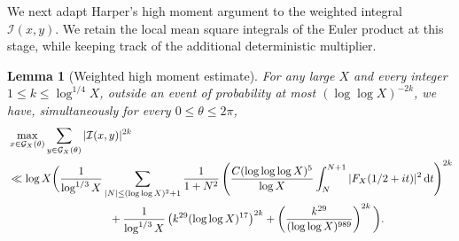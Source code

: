 \documentclass[a4paper,12pt,reqno]{amsart}
\numberwithin{equation}{section}
\newtheorem{lemma}[theorem]{Lemma}
\theoremstyle{remark}
\begin{document}
We next adapt Harper's high moment argument
\cite[Proposition~3 and Section~3.4]{Harper2023Large} to the weighted
integral ${\mathcal I}(x,y)$.  We retain the local mean square integrals
of the Euler product at this stage, while keeping track of the additional
deterministic multiplier.

\begin{lemma}[Weighted high moment estimate]
\label{lem:weighted-high-moment}
For any large $X$ and every integer $1\leq k\leq\log^{1/4}X$, outside an event of
probability at most $(\log\log X)^{-2k}$, we have, simultaneously for
every $0\leq\theta\leq2\pi$,
\begin{align}
 &\max_{x\in{\mathcal G}_X(\theta)}
 \sum_{y\in{\mathcal G}_X(\theta)}|{\mathcal I}(x,y)|^{2k}\notag\\
 &\ll \log X\bigg(
 \frac1{\log^{1/3}X}
 \sum_{|N|\leq(\log\log X)^2+1}\frac1{1+N^2}
 \left(
 \frac{C(\log\log\log X)^5}{\log X}
 \int_N^{N+1}|F_X(1/2+it)|^2\,\mathrm{d}t
 \right)^{2k}\notag\\
 &\hspace{32mm}
 +\frac1{\log^{1/3}X}
 \left(k^{29}(\log\log X)^{17}\right)^{2k}
 +\left(
 \frac{k^{29}}{(\log\log X)^{989}}
 \right)^{2k}
 \bigg). \label{eq:weighted-2k}
\end{align}
\end{lemma}
\end{document}
